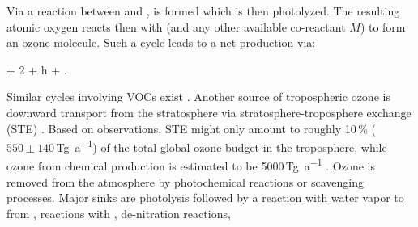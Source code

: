\documentclass[gmd, manuscript]{copernicus}
\begin{document}
Via a reaction between  and ,  is formed which is then photolyzed. The resulting atomic oxygen reacts then with  (and any other available co-reactant $M$) to form an ozone molecule.
Such a cycle leads to a net production via:
\begin{reaction}
   + 2 + h\nu \rightarrow {} + .
\end{reaction}
Similar cycles involving VOCs exist \citep{ACP:Monks2015}. Another source of tropospheric ozone is downward transport from the stratosphere via stratosphere-troposphere exchange (STE) \citep{WMO2014}. Based on observations, STE might only amount to roughly 10\,\unit{\%} ($550 \pm 140$\,\unit{Tg a^{-1}}) of the total global ozone budget in the troposphere, while ozone from chemical production is estimated to be 5000\,\unit{Tg a^{-1}} \citep{ACP:Monks2015}. Ozone is removed from the atmosphere by photochemical reactions or scavenging processes. Major sinks are photolysis followed by a reaction with water vapor to from ,
reactions with ,
de-nitration reactions,
\end{document}
